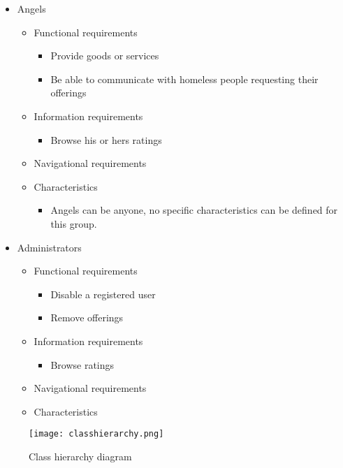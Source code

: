 \documentclass[a4paper]{report}
\begin{document}
\begin{itemize}
\item Angels
\begin{itemize}
\item Functional requirements
\begin{itemize}
	\item Provide goods or services
	\item Be able to communicate with homeless people requesting their offerings
\end{itemize}
\item Information requirements
\begin{itemize}
	\item Browse his or hers ratings
\end{itemize}
\item Navigational requirements
\item Characteristics
\begin{itemize}
	\item Angels can be anyone, no specific characteristics can be defined for this group.
\end{itemize}
\end{itemize}

\item Administrators
\begin{itemize}
\item Functional requirements
\begin{itemize}
	\item Disable a registered user
	\item Remove offerings
\end{itemize}
\item Information requirements
\begin{itemize}
	\item Browse ratings
\end{itemize}
\item Navigational requirements
\item Characteristics
\end{itemize}

\end{itemize}

\begin{figure}[htp]
\centering
\texttt{[image: classhierarchy.png]}
\caption{Class hierarchy diagram}
\label{fig:classhierarchy}
\end{figure}



\chapter{}


\chapter{}
\end{document}
